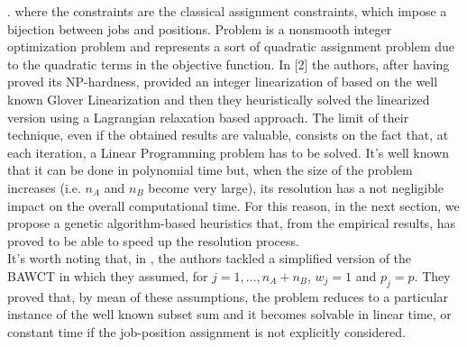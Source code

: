 \documentclass[opre,nonblindrev]{informs3} %
\begin{document}
\ea
\right.
\ee
where the constraints are the classical assignment constraints, which impose a bijection between jobs and positions. 
Problem  is a nonsmooth integer optimization problem and represents a sort of quadratic assignment problem due to the quadratic terms in the objective function. In [2] the authors, after having proved its NP-hardness, provided an integer linearization of  based on the well known Glover Linearization and then they heuristically solved the linearized version using a Lagrangian relaxation based approach. The limit of their technique, even if the obtained results are valuable, consists on the fact that, at each iteration, a Linear Programming problem has to be solved. It's well known that it can be done in polynomial time but, when the size of the problem increases (i.e. $n_A$ and $n_B$ become very large), its resolution has a not negligible impact on the overall computational time. For this reason, in the next section, we propose a genetic algorithm-based heuristics that, from the empirical results, has proved to be able to speed up the resolution process.\\
It's worth noting that, in \cite{av-fud20}, the authors tackled a simplified version of the BAWCT in which they assumed, for $j=1,\ldots,n_A+n_B$, $w_j=1$ and $p_j=p$. They proved that, by mean of these assumptions, the problem reduces to a particular instance of the well known subset sum and it becomes solvable in linear time, or constant time if the job-position assignment is not explicitly considered.
\end{document}
